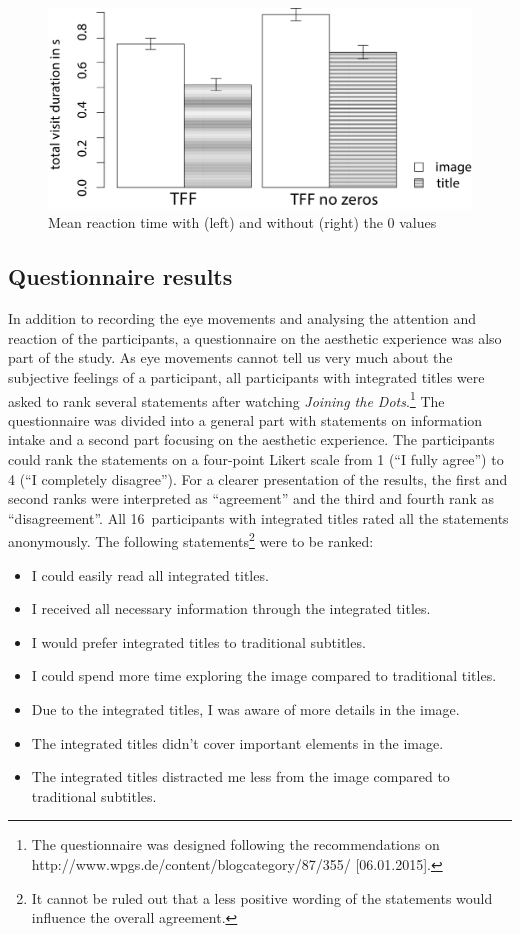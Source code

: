 \documentclass[output=paper]{langsci/langscibook}
\begin{document}
  
\begin{figure} 
  \includegraphics[height=.3\textheight]{figures/Fox10_neu.jpg}
  \caption{Mean reaction time with (left) and without (right) the 0 values}
  \label{fox:fig:10}
\end{figure}
 

\subsection{Questionnaire results}

In addition to recording the eye movements and analysing the attention and reaction of the participants, a questionnaire on the aesthetic experience was also part of the study. As eye movements cannot tell us very much about the subjective feelings of a participant, all participants with integrated titles were asked to rank several statements after watching \textit{Joining the Dots}.\footnote{The questionnaire was designed following the recommendations on http://www.wpgs.de/content/blogcategory/87/355/ [06.01.2015].} The questionnaire was divided into a general part with statements on information intake and a second part focusing on the aesthetic experience. The participants could rank the statements on a four-point Likert scale from 1 (``I fully agree'') to 4 (``I completely disagree''). For a clearer presentation of the results, the first and second ranks were interpreted as ``agreement'' and the third and fourth rank as ``disagreement''. All 16~participants with integrated titles rated all the statements anonymously. The following statements\footnote{It cannot be ruled out that a less positive wording of the statements would influence the overall agreement.} were to be ranked:

\begin{itemize}
\item I could easily read all integrated titles.
\item I received all necessary information through the integrated titles.
\item I would prefer integrated titles to traditional subtitles.
\item I could spend more time exploring the image compared to traditional titles.
\item Due to the integrated titles, I was aware of more details in the image.
\item The integrated titles didn't cover important elements in the image.
\item The integrated titles distracted me less from the image compared to traditional subtitles.
\end{itemize}
\end{document}
